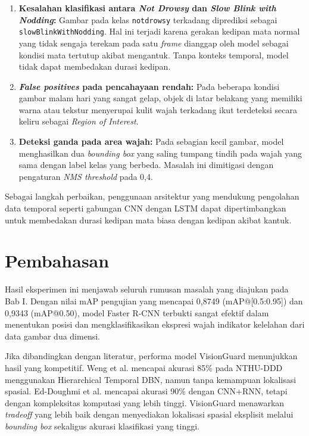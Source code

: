 \documentclass[11pt,a4paper,oneside]{report}
\begin{document}
\begin{enumerate}[leftmargin=*]
    \item \textbf{Kesalahan klasifikasi antara \textit{Not Drowsy} dan \textit{Slow Blink with Nodding}:} Gambar pada kelas \texttt{notdrowsy} terkadang diprediksi sebagai \texttt{slowBlinkWithNodding}. Hal ini terjadi karena gerakan kedipan mata normal yang tidak sengaja terekam pada satu \textit{frame} dianggap oleh model sebagai kondisi mata tertutup akibat mengantuk. Tanpa konteks temporal, model tidak dapat membedakan durasi kedipan.
    \item \textbf{\textit{False positives} pada pencahayaan rendah:} Pada beberapa kondisi gambar malam hari yang sangat gelap, objek di latar belakang yang memiliki warna atau tekstur menyerupai kulit wajah terkadang ikut terdeteksi secara keliru sebagai \textit{Region of Interest}.
    \item \textbf{Deteksi ganda pada area wajah:} Pada sebagian kecil gambar, model menghasilkan dua \textit{bounding box} yang saling tumpang tindih pada wajah yang sama dengan label kelas yang berbeda. Masalah ini dimitigasi dengan pengaturan \textit{NMS threshold} pada 0,4.
\end{enumerate}

Sebagai langkah perbaikan, penggunaan arsitektur yang mendukung pengolahan data temporal seperti gabungan CNN dengan LSTM dapat dipertimbangkan untuk membedakan durasi kedipan mata biasa dengan kedipan akibat kantuk.

\section{Pembahasan}

Hasil eksperimen ini menjawab seluruh rumusan masalah yang diajukan pada Bab I. Dengan nilai mAP pengujian yang mencapai 0,8749 (mAP@[0.5:0.95]) dan 0,9343 (mAP@0.50), model Faster R-CNN terbukti sangat efektif dalam menentukan posisi dan mengklasifikasikan ekspresi wajah indikator kelelahan dari data gambar dua dimensi.

Jika dibandingkan dengan literatur, performa model VisionGuard menunjukkan hasil yang kompetitif. Weng et al. \cite{weng2017driver} mencapai akurasi 85\% pada NTHU-DDD menggunakan Hierarchical Temporal DBN, namun tanpa kemampuan lokalisasi spasial. Ed-Doughmi et al. \cite{ed2020deep} mencapai akurasi 90\% dengan CNN+RNN, tetapi dengan kompleksitas komputasi yang lebih tinggi. VisionGuard menawarkan \textit{tradeoff} yang lebih baik dengan menyediakan lokalisasi spasial eksplisit melalui \textit{bounding box} sekaligus akurasi klasifikasi yang tinggi.
\end{document}
